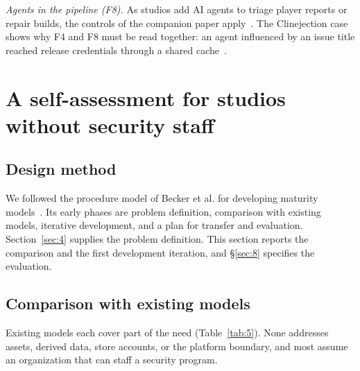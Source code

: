 \documentclass[acmsmall,screen,review]{acmart}
\begin{document}
\emph{Agents in the pipeline (F8).} As studios add AI agents to triage player reports or repair builds, the controls of the companion paper apply~\cite{keluoudeke2026untrusted}. The Clinejection case shows why F4 and F8 must be read together: an agent influenced by an issue title reached release credentials through a shared cache~\cite{khan2026clinejection}.


\section{A self-assessment for studios without security staff}\label{sec:6}


\subsection{Design method}\label{sec:6.1}

We followed the procedure model of Becker et al. for developing maturity models~\cite{becker2009developing}. Its early phases are problem definition, comparison with existing models, iterative development, and a plan for transfer and evaluation. Section~\ref{sec:4} supplies the problem definition. This section reports the comparison and the first development iteration, and \S\ref{sec:8} specifies the evaluation.


\subsection{Comparison with existing models}\label{sec:6.2}

Existing models each cover part of the need (Table~\ref{tab:5}). None addresses assets, derived data, store accounts, or the platform boundary, and most assume an organization that can staff a security program.
\end{document}
